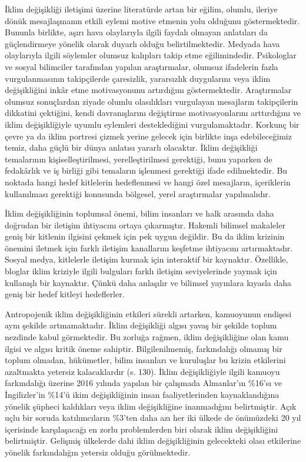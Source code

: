 \documentclass[
]{book}
\begin{document}
İklim değişikliği iletişimi üzerine literatürde artan bir eğilim, olumlu, ileriye dönük mesajlaşmanın etkili eylemi motive etmenin yolu olduğunu göstermektedir. Bununla birlikte, aşırı hava olaylarıyla ilgili faydalı olmayan anlatıları da güçlendirmeye yönelik olarak duyarlı olduğu belirtilmektedir. Medyada hava olaylarıyla ilgili söylemler olumsuz kalıpları takip etme eğilimindedir. Psikologlar ve sosyal bilimciler tarafından yapılan araştırmalar, olumsuz ifadelerin fazla vurgulanmasının takipçilerde çaresizlik, yararsızlık duygularını veya iklim değişikliğini inkâr etme motivasyonunu artırdığını göstermektedir. Araştırmalar olumsuz sonuçlardan ziyade olumlu olasılıkları vurgulayan mesajların takipçilerin dikkatini çektiğini, kendi davranışlarını değiştirme motivasyonlarını arttırdığını ve iklim değişikliğiyle uyumlu eylemleri desteklediğini vurgulamaktadır. Korkunç bir çevre ya da iklim portresi çizmek yerine gelecek için birlikte inşa edebileceğimiz temiz, daha güçlü bir dünya anlatısı yararlı olacaktır. İklim değişikliği temalarının kişiselleştirilmesi, yerelleştirilmesi gerektiği, bunu yaparken de fedakârlık ve iş birliği gibi temaların işlenmesi gerektiği ifade edilmektedir. Bu noktada hangi hedef kitlelerin hedeflenmesi ve hangi özel mesajların, içeriklerin kullanılması gerektiği konusunda bölgesel, yerel araştırmalar yapılmalıdır. \citep{munger2019avoiding}

İklim değişikliğinin toplumsal önemi, bilim insanları ve halk arasında daha doğrudan bir iletişim ihtiyacını ortaya çıkarmıştır. Hakemli bilimsel makaleler geniş bir kitlenin ilgisini çekmek için pek uygun değildir. Bu da iklim krizinin önemini iletmek için farklı iletişim kanallarını keşfetme ihtiyacını artırmaktadır. Sosyal medya, kitlelerle iletişim kurmak için interaktif bir kaynaktır. Özellikle, bloglar iklim kriziyle ilgili bulguları farklı iletişim seviyelerinde yaymak için kullanışlı bir kaynaktır. Çünkü daha anlaşılır ve bilimsel yayınlara kıyasla daha geniş bir hedef kitleyi hedeflerler. \citep{purath2019blogging}

Antropojenik iklim değişikliğinin etkileri sürekli artarken, kamuoyunun endişesi aynı şekilde artmamaktadır. İklim değişikliği algısı yavaş bir şekilde toplum nezdinde kabul görmektedir. Bu zorluğa rağmen, iklim değişikliğine olan kamu ilgisi ve algısı kritik öneme sahiptir. Bilgilenilmemiş, farkındalığı olmamış bir toplum olmadan, hükümetler, bilim insanları ve kuruluşlar bu krizin etkilerini azaltmakta yetersiz kalacaklardır (s. 130). \citep{purath2019blogging} İklim değişikliğiyle ilgili kamuoyu farkındalığı üzerine 2016 yılında yapılan bir çalışmada Almanlar'ın \%16'sı ve İngilizler'in \%14'ü ikim değişikliğinin insan faaliyetlerinden kaynaklandığına yönelik şüpheci kaldıkları veya iklim değişikliğine inanmadığını belirtmiştir. Açık uçlu bir soruda katılımcıların \%3'ten daha azı her iki ülkede de önümüzdeki 20 yıl içerisinde karşılaşacağı en zorlu problemlerden biri olarak iklim değişikliğini belirtmiştir. \citep{steentjes2017european} Gelişmiş ülkelerde dahi iklim değişikliğinin gelecekteki olası etkilerine yönelik farkındalığın yetersiz olduğu görülmektedir.
\end{document}
